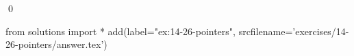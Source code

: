 
\begin{ex}
  \label{ex:14-26-pointers}
  
  \qed
\end{ex}
\begin{python0}
from solutions import *
add(label="ex:14-26-pointers",
    srcfilename='exercises/14-26-pointers/answer.tex')
\end{python0}
